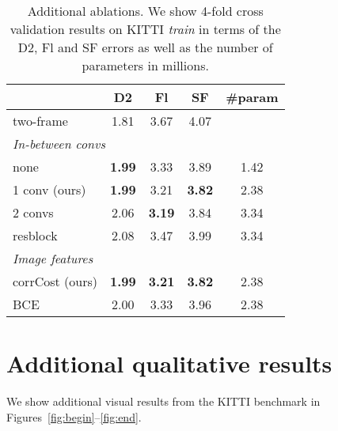 \documentclass[10pt,twocolumn,letterpaper]{article}
\begin{document}
\begin{table}
\caption{Additional ablations. We show 4-fold cross validation results on KITTI \emph{train} in terms of the D2, Fl and SF errors as well as the number of parameters in millions.}
\label{tab:addablations}
\begin{center}
{\setlength\tabcolsep{2.7pt}
\begin{tabular}{lcccc}
\toprule
& D2 & Fl & SF & \#param\!
\\
\midrule
\midrule
two-frame & 1.81 & 3.67 & 4.07
\\
\midrule
\midrule
\multicolumn{4}{l}{\emph{In-between convs}}
\\
\midrule
none & \textbf{1.99} & 3.33 & 3.89 & 1.42
\\
1 conv (ours) & \textbf{1.99} & 3.21 & \textbf{3.82} & 2.38
\\
2 convs & 2.06 & \textbf{3.19} & 3.84 & 3.34
\\
resblock & 2.08 & 3.47 & 3.99 & 3.34
\\
\midrule
\midrule
\multicolumn{4}{l}{\emph{Image features}}
\\
\midrule
corrCost (ours) & \textbf{1.99} & \textbf{3.21} & \textbf{3.82} & 2.38
\\
BCE & 2.00 & 3.33 & 3.96 & 2.38
\\
\bottomrule
\end{tabular}
}
\end{center}
\end{table}


\section{Additional qualitative results}
We show additional visual results from the KITTI benchmark in Figures~\ref{fig:begin}--\ref{fig:end}.
\end{document}
